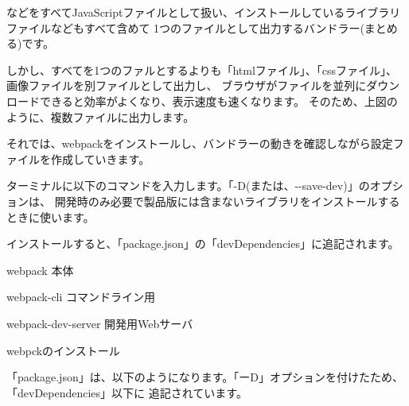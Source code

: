 などをすべてJavaScriptファイルとして扱い、インストールしているライブラリファイルなどもすべて含めて
1つのファイルとして出力するバンドラー(まとめる)です。

\vspace*{\baselineskip}

しかし、すべてを1つのファルとするよりも「htmlファイル」、「cssファイル」、画像ファイルを別ファイルとして出力し、
ブラウザがファイルを並列にダウンロードできると効率がよくなり、表示速度も速くなります。
そのため、上図のように、複数ファイルに出力します。

\vspace*{\baselineskip}

それでは、webpackをインストールし、バンドラーの動きを確認しながら設定ファイルを作成していきます。

\vspace*{\baselineskip}

ターミナルに以下のコマンドを入力します。「{-}D(または、{-}{-}save{-}dev)」のオプションは、
開発時のみ必要で製品版には含まないライブラリをインストールするときに使います。

\vspace*{\baselineskip}

インストールすると、「package.json」の「devDependencies」に追記されます。

\begin{starteritemize}
\item webpack  本体
\item webpack{-}cli コマンドライン用
\item webpack{-}dev{-}server 開発用Webサーバ
\end{starteritemize}

\def\startercodeblockfontsize{}
\begin{starterterminal}[]{webpckのインストール}\end{starterterminal}

「package.json」は、以下のようになります。「ーD」オプションを付けたため、「devDependencies」以下に
追記されています。

